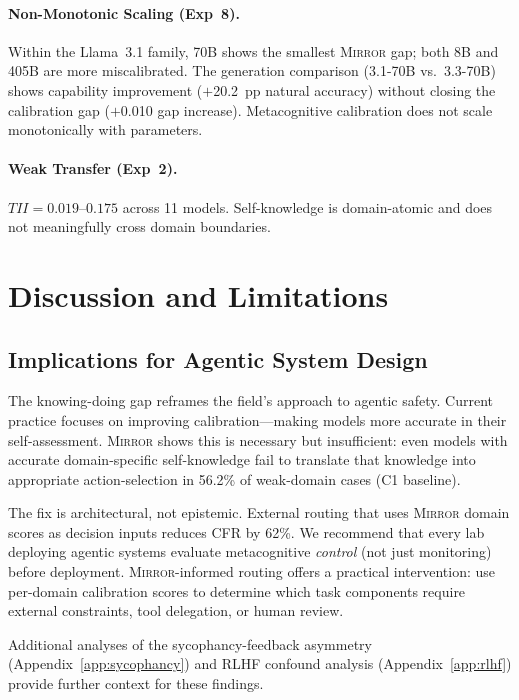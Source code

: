 \documentclass[10pt]{article}
\newcommand{\mirror}{\textsc{Mirror}}
\newcommand{\CFR}{CFR}
\newcommand{\TII}{TII}
\begin{document}
\paragraph{Non-Monotonic Scaling (Exp~8).}
Within the Llama~3.1 family, 70B shows the smallest \mirror{} gap; both 8B and
405B are more miscalibrated. The generation comparison (3.1-70B vs.\ 3.3-70B)
shows capability improvement ($+$20.2~pp natural accuracy) without closing the
calibration gap ($+$0.010 gap increase). Metacognitive calibration does not scale
monotonically with parameters.

\paragraph{Weak Transfer (Exp~2).}
$\TII{} = 0.019$--$0.175$ across 11 models. Self-knowledge is domain-atomic and does not meaningfully cross domain boundaries.

\section{Discussion and Limitations}
\label{sec:discussion}

\subsection{Implications for Agentic System Design}

The knowing-doing gap reframes the field's approach to agentic safety. Current
practice focuses on improving calibration---making models more accurate in their
self-assessment. \mirror{} shows this is necessary but insufficient: even models
with accurate domain-specific self-knowledge fail to translate that knowledge into
appropriate action-selection in 56.2\% of weak-domain cases (C1 baseline).

The fix is architectural, not epistemic. External routing that uses \mirror{}
domain scores as decision inputs reduces \CFR{} by 62\%. We recommend that every
lab deploying agentic systems evaluate metacognitive \textit{control} (not just
monitoring) before deployment. \mirror{}-informed routing offers a practical
intervention: use per-domain calibration scores to determine which task components
require external constraints, tool delegation, or human review.

Additional analyses of the sycophancy-feedback asymmetry (Appendix~\ref{app:sycophancy}) and RLHF confound analysis (Appendix~\ref{app:rlhf}) provide further context for these findings.
\end{document}
